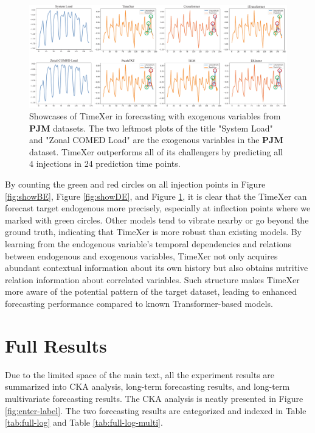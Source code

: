\documentclass[nohyperref]{article}
\theoremstyle{plain}
\theoremstyle{definition}
\theoremstyle{remark}
\begin{document}
\begin{figure}[!htbp]
    \centering
    \includegraphics[width=\linewidth]{fig/TimeXer_Showcase_PJM_360.pdf}
    \vspace{-20pt}
    \caption{Showcases of TimeXer in forecasting with exogenous variables from \textbf{PJM} datasets. The two leftmost plots of the title "System Load" and "Zonal COMED Load" are the exogenous variables in the \textbf{PJM} dataset. TimeXer outperforms all of its challengers by predicting all 4 injections in 24 prediction time points.}
    \label{fig:showPJM}
\end{figure}


By counting the green and red circles on all injection points in Figure \ref{fig:showBE}, Figure \ref{fig:showDE}, and Figure \ref{fig:showPJM}, it is clear that the TimeXer can forecast target endogenous more precisely, especially at inflection points where we marked with green circles. Other models tend to vibrate nearby or go beyond the ground truth, indicating that TimeXer is more robust than existing models. By learning from the endogenous variable's temporal dependencies and relations between endogenous and exogenous variables, TimeXer not only acquires abundant contextual information about its own history but also obtains nutritive relation information about correlated variables. Such structure makes TimeXer more aware of the potential pattern of the target dataset, leading to enhanced forecasting performance compared to known Transformer-based models.





\section{Full Results}

Due to the limited space of the main text, all the experiment results are summarized into CKA analysis, long-term forecasting results, and long-term multivariate forecasting results. The CKA analysis is neatly presented in Figure \ref{fig:enter-label}. The two forecasting results are categorized and indexed in Table \ref{tab:full-log} and Table \ref{tab:full-log-multi}.
\end{document}

